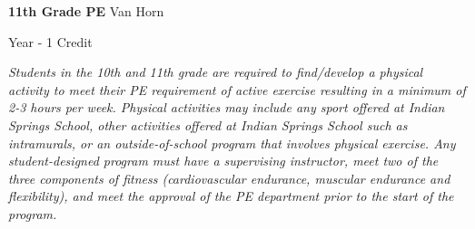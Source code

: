 \noindent\textbf{11th Grade PE} \hfill Van Horn

\noindent Year - 1 Credit

\vspace{1mm}\emph{Students in the 10th and 11th grade are required to find/develop a physical activity to meet their PE requirement of active exercise resulting in a minimum of 2-3 hours per week.  Physical activities may include any sport offered at Indian Springs School, other activities offered at Indian Springs School such as intramurals, or an outside-of-school program that involves physical exercise.  Any student-designed program must have a supervising instructor, meet two of the three components of fitness (cardiovascular endurance, muscular endurance and flexibility), and meet the approval of the PE department prior to the start of the program.}\\


